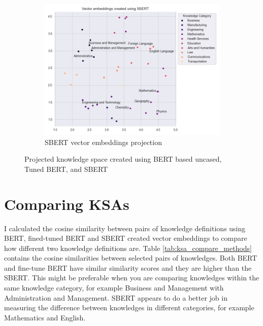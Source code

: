 \documentclass[12pt]{article}
\begin{document}
\begin{figure}
    \vspace{10pt} %
  
    \begin{subfigure}{0.45\textwidth}
      \centering
      \includegraphics[width=\linewidth]{../plots/base_sbert.png}
      \caption{SBERT vector embeddings projection}
      \label{fig:ksa_space_sbert}
    \end{subfigure}
  
    \caption{Projected knowledge space created using BERT based uncased, Tuned BERT, and SBERT}
    \label{fig:ksa_space}

\end{figure}

\section{Comparing KSAs}

I calculated the cosine similarity between pairs of knowledge definitions using BERT, fined-tuned BERT and SBERT created vector embeddings to compare how different two knowledge definitions are. Table \ref{tab:ksa_compare_methods} contains the cosine similarities between selected pairs of knowledges. Both BERT and fine-tune BERT have similar similarity scores and they are higher than the SBERT. This might be preferable when you are comparing knowledges within the same knowledge category, for example Business and Management with Administration and Management. SBERT appears to do a better job in measuring the difference between knowledges in different categories, for example Mathematics and English.\\
\end{document}
